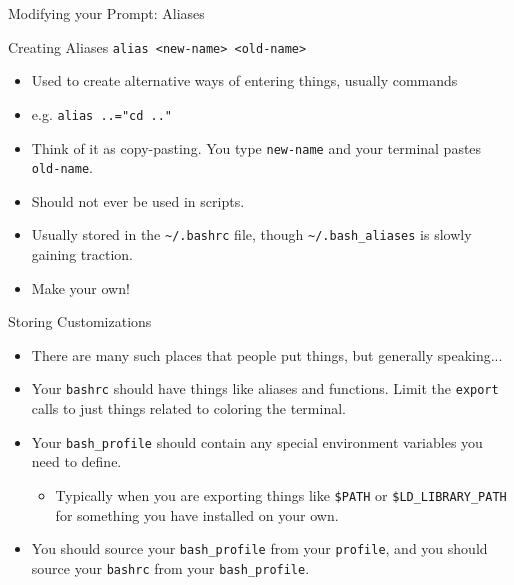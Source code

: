\documentclass[11pt]{beamer}
\newcommand{\colbf}[1]{\textcolor{mLightBrown!77!black}{#1}}%
\begin{document}
\begin{frame}[fragile]{Modifying your Prompt: Aliases}
  \begin{block}{Creating \colbf{Alias}es}
    \texttt{alias <new-name> <old-name>}
    \begin{itemize}
      \item Used to create alternative ways of entering things, usually commands
      \item e.g. \texttt{alias ..="cd .."}
      \item Think of it as copy-pasting.  You type \texttt{new-name} and your terminal pastes \texttt{old-name}.
      \item Should not ever be used in scripts.
    \end{itemize}
  \end{block}
  \begin{itemize}[<+- | alert@+>]
    \item Usually stored in the \texttt{\textasciitilde/.bashrc} file, though \texttt{\textasciitilde/.bash\_aliases}
          is slowly gaining traction.
    \item Make your own!
  \end{itemize}
\end{frame}

\begin{frame}[fragile]{Storing Customizations}
  \begin{itemize}[<+- | alert@+>]
    \item There are many such places that people put things, but generally speaking...
    \item Your \texttt{bashrc} should have things like aliases and functions.  Limit the \texttt{export} calls
          to just things related to coloring the terminal.
    \item Your \texttt{bash\_profile} should contain any special environment variables you need to define.
    \begin{itemize}[<+- | alert@+>]
      \item Typically when you are exporting things like \texttt{\$PATH} or \texttt{\$LD\_LIBRARY\_PATH} for
            something you have installed on your own.
    \end{itemize}
    \item You should source your \texttt{bash\_profile} from your \texttt{profile}, and you should source your
          \texttt{bashrc} from your \texttt{bash\_profile}.
  \end{itemize}
\end{frame}
\end{document}
